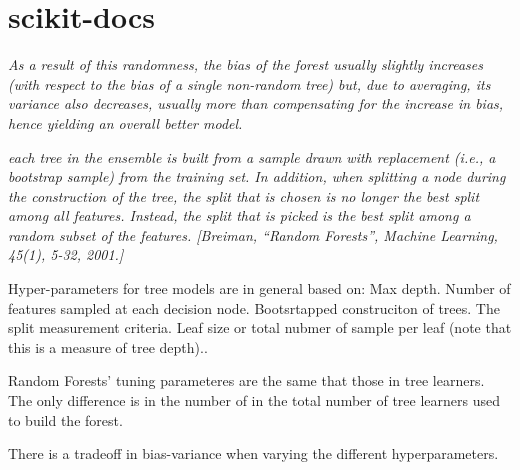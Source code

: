 
\section{scikit-docs}
	
\textit{As a result of this randomness, the bias of the forest usually slightly increases (with respect to the bias of a single non-random tree) but, due to averaging, its variance also decreases, usually more than compensating for the increase in bias, hence yielding an overall better model.}

	\textit{each tree in the ensemble is built from a sample drawn with replacement (i.e., a bootstrap sample) from the training set. In addition, when splitting a node during the construction of the tree, the split that is chosen is no longer the best split among all features. Instead, the split that is picked is the best split among a random subset of the features. [Breiman, “Random Forests”, Machine Learning, 45(1), 5-32, 2001.] }
	
	
	Hyper-parameters for tree models are in general based on:
	Max depth. Number of features sampled at each decision node. Bootsrtapped construciton of trees. The split measurement criteria. Leaf size or total nubmer of sample per leaf (note that this is a measure of tree depth).. 
	
	Random Forests' tuning parameteres are the same that those in tree learners. The only difference is in the number of in the total number of tree learners used to build the forest.
	
	There is a tradeoff in bias-variance when varying the different hyperparameters. 

